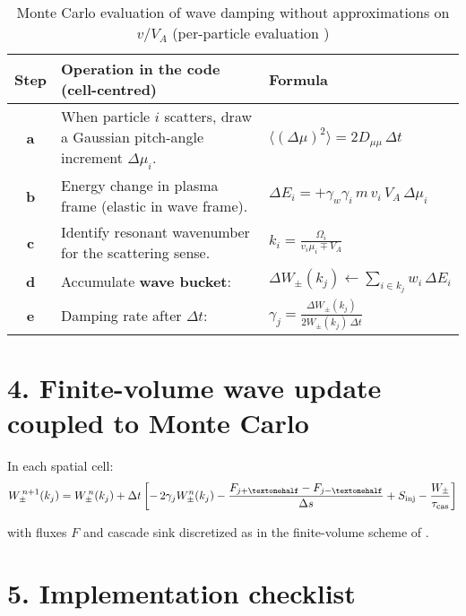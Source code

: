 \begin{table}[H]
\centering
\renewcommand{\arraystretch}{1.2}
\begin{tabular}{|c|p{7cm}|p{5cm}|}
\hline
\textbf{Step} & \textbf{Operation in the code (cell-centred)} & \textbf{Formula} \\
\hline
\textbf{a} & When particle $i$ scatters, draw a Gaussian pitch-angle increment $\Delta\mu_i$. & $\langle(\Delta\mu)^2\rangle = 2D_{\mu\mu}\,\Delta t$ \\
\hline
\textbf{b} & Energy change in plasma frame (elastic in wave frame). & $\Delta E_i = +\gamma_w \gamma_i\, m\,v_i\,V_A\,\Delta\mu_i$ \cite{Melrose1980} \\
\hline
\textbf{c} & Identify resonant wavenumber for the scattering sense. & $k_i = \frac{\Omega_i}{v_i \mu_i \mp V_A}$ \\
\hline
\textbf{d} & Accumulate \textbf{wave bucket}: & $\Delta W_\pm(k_j) \leftarrow \sum_{i \in k_j} w_i\,\Delta E_i$ \\
\hline
\textbf{e} & Damping rate after $\Delta t$: & $\gamma_j = \frac{\Delta W_\pm(k_j)}{2W_\pm(k_j)\,\Delta t}$ \\
\hline
\end{tabular}
\caption{Monte Carlo evaluation of wave damping without approximations on $v/V_A$ (per-particle evaluation \cite{Eichler1979,Shalchi2009})}
\end{table}

\section*{4. Finite-volume wave update coupled to Monte Carlo}

In each spatial cell:
\begin{equation}
W_\pm^{\,n+1}(k_j) =
W_\pm^{\,n}(k_j) + \Delta t \left[
-\,2\gamma_j W_\pm^n(k_j)
- \frac{F_{j+½}-F_{j-½}}{\Delta s}
+ S_{\rm inj}
- \frac{W_\pm}{\tau_{\rm cas}}
\right]
\label{eq:waveupdate}
\end{equation}

with fluxes $F$ and cascade sink discretized as in the finite-volume scheme of \cite{Matthaeus1999,Oughton2011}.

\section*{5. Implementation checklist}

